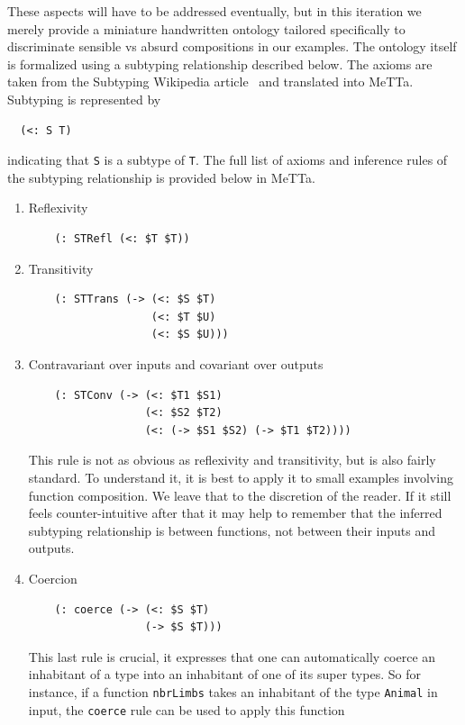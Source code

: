 \documentclass[]{report}
\begin{document}
These aspects will have to be addressed eventually, but in this
iteration we merely provide a miniature handwritten ontology tailored
specifically to discriminate sensible vs absurd compositions in our
examples.  The ontology itself is formalized using a subtyping
relationship described below.  The axioms are taken from the Subtyping
Wikipedia article~\cite{TODO} and translated into MeTTa.  Subtyping is
represented by
\begin{verbatim}
  (<: S T)
\end{verbatim}
indicating that \texttt{S} is a subtype of
\texttt{T}.  The full list of axioms and inference rules
of the subtyping relationship is provided below in MeTTa.
\begin{enumerate}
\item Reflexivity
  \begin{verbatim}
    (: STRefl (<: $T $T))
  \end{verbatim}
\item Transitivity
  \begin{verbatim}
    (: STTrans (-> (<: $S $T)
                   (<: $T $U)
                   (<: $S $U)))
  \end{verbatim}
\item Contravariant over inputs and covariant over outputs
  \begin{verbatim}
    (: STConv (-> (<: $T1 $S1)
                  (<: $S2 $T2)
                  (<: (-> $S1 $S2) (-> $T1 $T2))))
  \end{verbatim}
  This rule is not as obvious as reflexivity and transitivity, but is
  also fairly standard.  To understand it, it is best to apply it to
  small examples involving function composition.  We leave that to the
  discretion of the reader.  If it still feels counter-intuitive after
  that it may help to remember that the inferred subtyping
  relationship is between functions, not between their inputs and
  outputs.
\item Coercion
  \begin{verbatim}
    (: coerce (-> (<: $S $T)
                  (-> $S $T)))
  \end{verbatim}
  This last rule is crucial, it expresses that one can automatically
  coerce an inhabitant of a type into an inhabitant of one of its
  super types.  So for instance, if a function
  \texttt{nbrLimbs} takes an inhabitant of the type
  \texttt{Animal} in input, the
  \texttt{coerce} rule can be used to apply this function

\end{enumerate}
\end{document}
